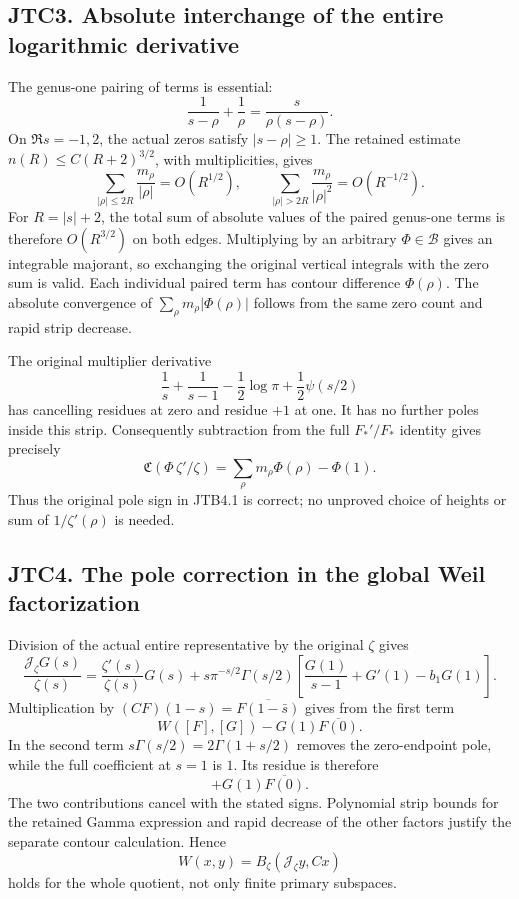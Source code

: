 \subsection{JTC3. Absolute interchange of the entire logarithmic
derivative}\label{jtc3.-absolute-interchange-of-the-entire-logarithmic-derivative}

The genus-one pairing of terms is essential: \[
\frac1{s-\rho}+\frac1\rho=\frac{s}{\rho(s-\rho)}.
\] On \(\Re s=-1,2\), the actual zeros satisfy \(|s-\rho|\ge1\). The
retained estimate \(n(R)\le C(R+2)^{3/2}\), with multiplicities, gives
\[
\sum_{|\rho|\le 2R}\frac{m_\rho}{|\rho|}=O(R^{1/2}),
\qquad
\sum_{|\rho|>2R}\frac{m_\rho}{|\rho|^2}=O(R^{-1/2}).
\] For \(R=|s|+2\), the total sum of absolute values of the paired
genus-one terms is therefore \(O(R^{3/2})\) on both edges. Multiplying
by an arbitrary \(\Phi\in\mathcal B\) gives an integrable majorant, so
exchanging the original vertical integrals with the zero sum is valid.
Each individual paired term has contour difference \(\Phi(\rho)\). The
absolute convergence of \(\sum_\rho m_\rho|\Phi(\rho)|\) follows from
the same zero count and rapid strip decrease.

The original multiplier derivative \[
\frac1s+\frac1{s-1}-\frac12\log\pi+\frac12\psi(s/2)
\] has cancelling residues at zero and residue \(+1\) at one. It has no
further poles inside this strip. Consequently subtraction from the full
\(F_*'/F_*\) identity gives precisely \[
\mathfrak C(\Phi\,\zeta'/\zeta)
=\sum_\rho m_\rho\Phi(\rho)-\Phi(1).
\] Thus the original pole sign in JTB4.1 is correct; no unproved choice
of heights or sum of \(1/\zeta'(\rho)\) is needed.

\subsection{JTC4. The pole correction in the global Weil
factorization}\label{jtc4.-the-pole-correction-in-the-global-weil-factorization}

Division of the actual entire representative by the original \(\zeta\)
gives \[
\frac{\mathscr J_\zeta G(s)}{\zeta(s)}
=\frac{\zeta'(s)}{\zeta(s)}G(s)
+s\pi^{-s/2}\Gamma(s/2)
\left[\frac{G(1)}{s-1}+G'(1)-b_1G(1)\right].
\] Multiplication by \((CF)(1-s)=\overline{F(1-\bar s)}\) gives from the
first term \[
W([F],[G])-G(1)\overline{F(0)}.
\] In the second term \(s\Gamma(s/2)=2\Gamma(1+s/2)\) removes the
zero-endpoint pole, while the full coefficient at \(s=1\) is \(1\). Its
residue is therefore \[
+G(1)\overline{F(0)}.
\] The two contributions cancel with the stated signs. Polynomial strip
bounds for the retained Gamma expression and rapid decrease of the other
factors justify the separate contour calculation. Hence \[
W(x,y)=B_\zeta(\mathcal J_\zeta y,Cx)
\] holds for the whole quotient, not only finite primary subspaces.

